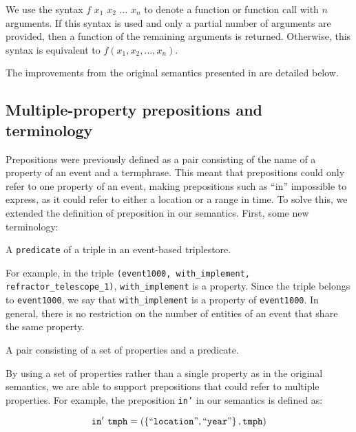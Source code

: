 \documentclass[../main.tex]{subfiles}
\begin{document}
We use the syntax $f$ $x_1$ $x_2$ $\dots$ $x_n$ to denote a function or function call with $n$ arguments.  If this syntax is used
and only a partial number of arguments are provided, then a function of the remaining arguments is returned.  Otherwise,
this syntax is equivalent to $f(x_1, x_2, \dots, x_n)$.

The improvements from the original semantics presented in
\cite{frost2014demonstration}\cite{frostagboola2014} are detailed below.

\subsection{Multiple-property prepositions and terminology}

Prepositions were previously defined as a pair consisting of the name of a property of an event and a termphrase.  This meant that prepositions could
only refer to one property of an event, making prepositions such as ``in''
impossible to express, as it could refer to either a location or a range in time.
To solve this, we extended the definition of preposition in our semantics.  First, some new terminology:

\begin{definition}[Property]
	A \texttt{predicate} of a triple in an event-based triplestore.
\end{definition}

For example, in the triple \texttt{(event1000, with\_implement, refractor\_telescope\_1)}, \texttt{with\_implement} is a property.  Since the triple belongs to \texttt{event1000}, we say that \texttt{with\_implement} is a property of \texttt{event1000}.  In general, there is no restriction on the number of entities of an event that share the same property.

\begin{definition}[Preposition]
	A pair consisting of a set of properties and a predicate.
\end{definition}

By using a set of properties rather than a single property as in the original semantics, we are able to support prepositions that could refer to multiple properties.
For example, the preposition \texttt{in'} in our semantics is defined as:

\begin{equation*}
	\mathtt{in'} \  \mathtt{tmph} = \left(\left\{\text{``\texttt{location}''}, \text{``\texttt{year}''}\right\}, \mathtt{tmph}\right)
\end{equation*}
\end{document}
